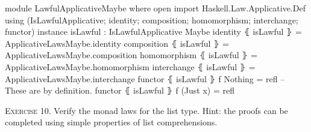 \documentclass{article}
\begin{document}
\begin{code}
module LawfulApplicativeMaybe where
  open import Haskell.Law.Applicative.Def
    using (IsLawfulApplicative; identity; composition;
      homomorphism; interchange; functor)
  instance
    isLawful : IsLawfulApplicative Maybe
    identity ⦃ isLawful ⦄ = ApplicativeLawsMaybe.identity
    composition ⦃ isLawful ⦄ = ApplicativeLawsMaybe.composition
    homomorphism ⦃ isLawful ⦄ = ApplicativeLawsMaybe.homomorphism
    interchange ⦃ isLawful ⦄ = ApplicativeLawsMaybe.interchange
    functor ⦃ isLawful ⦄ f Nothing = refl -- These are by definition.
    functor ⦃ isLawful ⦄ f (Just x) = refl
\end{code}

\clearpage

\noindent
\textsc{Exercise 10.} Verify the monad laws for the list type. Hint: the proofs can be completed using simple properties of list comprehensions.
\end{document}
